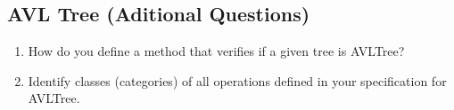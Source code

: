 \documentclass[12pt]{article}
\begin{document}
\begin{spacing}{1.5}
\section*{AVL Tree (Aditional Questions)}

\begin{enumerate}

\item How do you define a method that verifies if a given tree is AVLTree?\\

\item Identify classes (categories) of all operations defined in your specification for AVLTree.\\

\end{enumerate}

\end{spacing}
\end{document}
